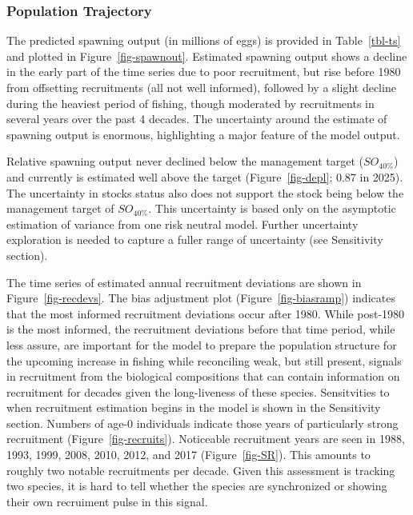 \documentclass[
]{scrartcl}
\begin{document}
\subsubsection{Population Trajectory}\label{population-trajectory}

The predicted spawning output (in millions of eggs) is provided in
Table~\ref{tbl-ts} and plotted in Figure~\ref{fig-spawnout}. Estimated
spawning output shows a decline in the early part of the time series due
to poor recruitment, but rise before 1980 from offsetting recruitments
(all not well informed), followed by a slight decline during the
heaviest period of fishing, though moderated by recruitments in several
years over the past 4 decades. The uncertainty around the estimate of
spawning output is enormous, highlighting a major feature of the model
output.

Relative spawning output never declined below the management target
(\(SO_{40\%}\)) and currently is estimated well above the target
(Figure~\ref{fig-depl}; 0.87 in 2025). The uncertainty in stocks status
also does not support the stock being below the management target of
\(SO_{40\%}\). This uncertainty is based only on the asymptotic
estimation of variance from one risk neutral model. Further uncertainty
exploration is needed to capture a fuller range of uncertainty (see
Sensitivity section).

The time series of estimated annual recruitment deviations are shown in
Figure~\ref{fig-recdevs}. The bias adjustment plot
(Figure~\ref{fig-biasramp}) indicates that the most informed recruitment
deviations occur after 1980. While post-1980 is the most informed, the
recruitment deviations before that time period, while less assure, are
important for the model to prepare the population structure for the
upcoming increase in fishing while reconciling weak, but still present,
signals in recruitment from the biological compositions that can contain
information on recruitment for decades given the long-liveness of these
species. Sensitvities to when recruitment estimation begins in the model
is shown in the Sensitivity section. Numbers of age-0 individuals
indicate those years of particularly strong recruitment
(Figure~\ref{fig-recruits}). Noticeable recruitment years are seen in
1988, 1993, 1999, 2008, 2010, 2012, and 2017 (Figure~\ref{fig-SR}). This
amounts to roughly two notable recruitments per decade. Given this
assessment is tracking two species, it is hard to tell whether the
species are synchronized or showing their own recruiment pulse in this
signal.
\end{document}
